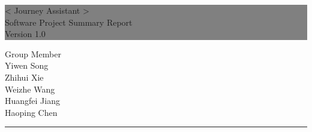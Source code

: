 \documentclass[10pt]{article}
\begin{document}

\begin{titlepage} %
	
	
	\colorbox{grey}{
		\parbox[t]{1.1\textwidth}{ %
			\parbox[t]{1.02\textwidth}{ %
				\raggedleft %
				\fontsize{34pt}{40pt}\selectfont %
				\vspace{0.7cm} %
				
				< Journey Assistant >\\
                Software Project Summary Report\\
                Version 1.0\\
				
				\vspace{0.7cm} %
			}
		}
	}
	
	\vfill %
	
	
	\parbox[t]{1\textwidth}{ %
		\raggedleft %
		\large %
		{\Large Group Member}\\[4pt] %
        Yiwen Song\\
        Zhihui Xie\\
        Weizhe Wang\\
        Huangfei Jiang\\
        Haoping Chen\\
		
		\hfill\rule{0.2\linewidth}{1pt}%
    }
    
	
\end{titlepage}
\end{document}

